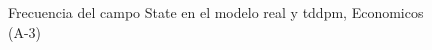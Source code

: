 \begin{figure}[H]
    \centering
    
    \caption{Frecuencia del campo State en el modelo real y tddpm, Economicos (A-3)}
    \label{frecuency-State-tddpm_mlp}
\end{figure}